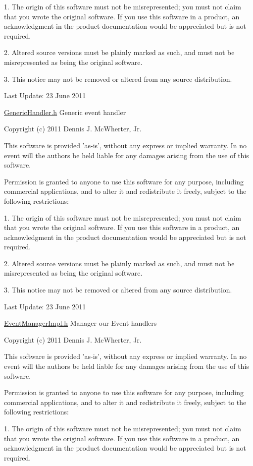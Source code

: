 1. The origin of this software must not be misrepresented; you must not claim that you wrote the original software. If you use this software in a product, an acknowledgment in the product documentation would be appreciated but is not required.

2. Altered source versions must be plainly marked as such, and must not be misrepresented as being the original software.

3. This notice may not be removed or altered from any source distribution.

Last Update: 23 June 2011

\hyperlink{_generic_handler_8h_source}{GenericHandler.h} Generic event handler

Copyright (c) 2011 Dennis J. McWherter, Jr.

This software is provided 'as-\/is', without any express or implied warranty. In no event will the authors be held liable for any damages arising from the use of this software.

Permission is granted to anyone to use this software for any purpose, including commercial applications, and to alter it and redistribute it freely, subject to the following restrictions:

1. The origin of this software must not be misrepresented; you must not claim that you wrote the original software. If you use this software in a product, an acknowledgment in the product documentation would be appreciated but is not required.

2. Altered source versions must be plainly marked as such, and must not be misrepresented as being the original software.

3. This notice may not be removed or altered from any source distribution.

Last Update: 23 June 2011

\hyperlink{_event_manager_impl_8h_source}{EventManagerImpl.h} Manager our Event handlers

Copyright (c) 2011 Dennis J. McWherter, Jr.

This software is provided 'as-\/is', without any express or implied warranty. In no event will the authors be held liable for any damages arising from the use of this software.

Permission is granted to anyone to use this software for any purpose, including commercial applications, and to alter it and redistribute it freely, subject to the following restrictions:

1. The origin of this software must not be misrepresented; you must not claim that you wrote the original software. If you use this software in a product, an acknowledgment in the product documentation would be appreciated but is not required.

